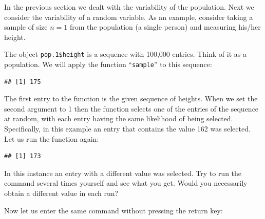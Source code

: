 \documentclass[]{krantz}
\makeatletter
\newenvironment{Shaded}{\begin{snugshade}}{\end{snugshade}}
\newcommand{\DecValTok}[1]{\textcolor[rgb]{0.00,0.00,0.81}{#1}}
\newcommand{\FloatTok}[1]{\textcolor[rgb]{0.00,0.00,0.81}{#1}}
\newcommand{\KeywordTok}[1]{\textcolor[rgb]{0.13,0.29,0.53}{\textbf{#1}}}
\newcommand{\NormalTok}[1]{#1}
\newcommand{\OperatorTok}[1]{\textcolor[rgb]{0.81,0.36,0.00}{\textbf{#1}}}
\newenvironment{kframe}{%
\medskip{}
\setlength{\fboxsep}{.8em}
 \def\at@end@of@kframe{}%
 \ifinner\ifhmode%
  \def\at@end@of@kframe{\end{minipage}}%
  \begin{minipage}{\columnwidth}%
 \fi\fi%
 \def\FrameCommand##1{\hskip\@totalleftmargin \hskip-\fboxsep
 \colorbox{shadecolor}{##1}\hskip-\fboxsep
     \hskip-\linewidth \hskip-\@totalleftmargin \hskip\columnwidth}%
 \MakeFramed {\advance\hsize-\width
   \@totalleftmargin\z@ \linewidth\hsize
   \@setminipage}}%
 {\par\unskip\endMakeFramed%
 \at@end@of@kframe}
\renewenvironment{Shaded}{\begin{kframe}}{\end{kframe}}
\theoremstyle{definition}
\theoremstyle{definition}
\theoremstyle{definition}
\theoremstyle{remark}
\makeatother
\begin{document}
In the previous section we dealt with the variability of the population.
Next we consider the variability of a random variable. As an example,
consider taking a sample of size \(n=1\) from the population (a single
person) and measuring his/her height.

The object \texttt{pop.1\$height} is a sequence with 100,000 entries. Think of
it as a population. We will apply the function ``\texttt{sample}'' to this
sequence:

\begin{Shaded}
\end{Shaded}

\begin{verbatim}
## [1] 175
\end{verbatim}

The first entry to the function is the given sequence of heights. When
we set the second argument to 1 then the function selects one of the
entries of the sequence at random, with each entry having the same
likelihood of being selected. Specifically, in this example an entry
that contains the value 162 was selected. Let us run the function again:

\begin{Shaded}
\end{Shaded}

\begin{verbatim}
## [1] 173
\end{verbatim}

In this instance an entry with a different value was selected. Try to
run the command several times yourself and see what you get. Would you
necessarily obtain a different value in each run?

Now let us enter the same command without pressing the return key:

\begin{Shaded}
\end{Shaded}
\end{document}
